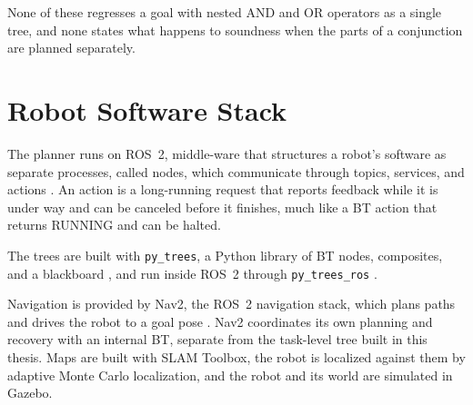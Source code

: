     None of these regresses a goal with nested AND and OR operators as a single tree, and none states what happens to soundness when the parts of a conjunction are planned separately.

\section{Robot Software Stack}
\label{sec:ros_stack}
    The planner runs on ROS~2, middle-ware that structures a robot's software as separate processes, called nodes, which communicate through topics, services, and actions \cite{macenski2022ros2}.
    An action is a long-running request that reports feedback while it is under way and can be canceled before it finishes, much like a BT action that returns RUNNING and can be halted.

    The trees are built with \texttt{py\_trees}, a Python library of BT nodes, composites, and a blackboard \cite{pytrees}, and run inside ROS~2 through \texttt{py\_trees\_ros} \cite{pytreesros}.

    Navigation is provided by Nav2, the ROS~2 navigation stack, which plans paths and drives the robot to a goal pose \cite{macenski2020nav2}.
    Nav2 coordinates its own planning and recovery with an internal BT, separate from the task-level tree built in this thesis.
    Maps are built with SLAM Toolbox, the robot is localized against them by adaptive Monte Carlo localization, and the robot and its world are simulated in Gazebo.